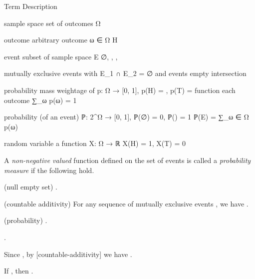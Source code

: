 \startchapter [title={Discrete Probability Spaces}]

	\setuptabulate [
		split=yes,
		header=text,
		frame=on,
		title={\tfa Notations}]

	\starttabulate [|l|l|M|m|]
		\FL  \FL
		\NC  Term  \NC  Description  \NC  {}  \NC  {}  \NR
		\ML  \ML

		\NC  sample space  \NC  set of outcomes  \NC  Ω  \NC  \bcrl[H, T]  \NR  \ML

		\NC  outcome  \NC  arbitrary outcome  \NC  ω ∈ Ω  \NC  H  \NR  \ML

		\NC  event  \NC  subset of sample space  \NC  E  \NC  ∅, \bcrl[H], \bcrl[T], \bcrl[H, T]  \NR  \ML

		\NC  mutually exclusive  \NC  events with  \NC  E_1 ∩ E_2 = ∅  \NC  \bcrl[H] and \bcrl[T]  \NR
		\NC  events  \NC  empty intersection  \NC  \NC  \NR  \ML

		\NC  probability mass  \NC  weightage of  \NC  p: Ω → [0, 1],   \NC  p(H) = , p(T) =   \NR
		\NC  function  \NC   each outcome  \NC  ∑_ω p(ω) = 1  \NC  \NR  \ML

		\NC  probability  \NC  (of an event)  \NC  ℙ: 2^Ω → [0, 1],  \NC  ℙ(∅) = 0, ℙ(\bcrl[H, T]) = 1  \NR
		\NC  \NC  \NC  ℙ(E) = ∑_{ω ∈ Ω} p(ω)  \NC  \NR  \ML

		\NC  random variable  \NC  a function  \NC  X: Ω → ℝ  \NC  X(H) = 1, X(T) = 0  \NR  \ML
		\BL
	\stoptabulate

	
	\startdefinition [title={Probability axioms}]
		A \emph{non-negative valued} function  defined on the set of events is called a \emph{probability measure} if the following hold.
			\item  (null empty set)  .
			\item[countable-additivity]  (countable additivity)  For any sequence of mutually exclusive events , we have .
			\item  (probability)  .
		\stopitemize
	\stopdefinition

	

	\startproposition
		.
	\stopproposition

	\startproof
		Since , by [countable-additivity] we have .
	\stopproof


	\startproposition
		If , then .
	\stopproposition


